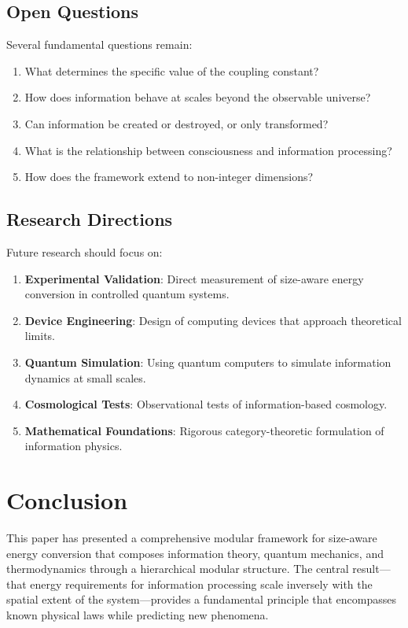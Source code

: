 \documentclass[11pt,a4paper]{article}
\theoremstyle{definition}
\begin{document}
\subsection{Open Questions}

Several fundamental questions remain:

\begin{enumerate}
\item What determines the specific value of the coupling constant?
\item How does information behave at scales beyond the observable universe?
\item Can information be created or destroyed, or only transformed?
\item What is the relationship between consciousness and information processing?
\item How does the framework extend to non-integer dimensions?
\end{enumerate}

\subsection{Research Directions}

Future research should focus on:

\begin{enumerate}
\item \textbf{Experimental Validation}: Direct measurement of size-aware energy conversion in controlled quantum systems.

\item \textbf{Device Engineering}: Design of computing devices that approach theoretical limits.

\item \textbf{Quantum Simulation}: Using quantum computers to simulate information dynamics at small scales.

\item \textbf{Cosmological Tests}: Observational tests of information-based cosmology.

\item \textbf{Mathematical Foundations}: Rigorous category-theoretic formulation of information physics.
\end{enumerate}

\section{Conclusion}

This paper has presented a comprehensive modular framework for size-aware energy conversion that composes information theory, quantum mechanics, and thermodynamics through a hierarchical modular structure. The central result—that energy requirements for information processing scale inversely with the spatial extent of the system—provides a fundamental principle that encompasses known physical laws while predicting new phenomena.
\end{document}
